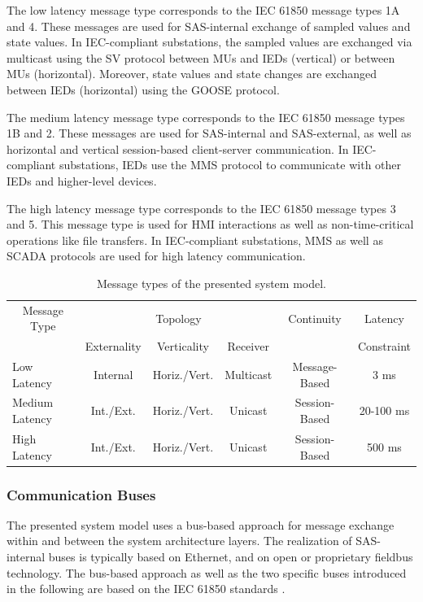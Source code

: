 The low latency message type corresponds to the IEC 61850 \cite{IEC61850P5} message types 1A and 4.
These messages are used for SAS-internal exchange of sampled values and state values.
In IEC-compliant substations, the sampled values are exchanged via multicast using the SV protocol between MUs and IEDs (vertical) or between MUs (horizontal).
Moreover, state values and state changes are exchanged between IEDs (horizontal) using the GOOSE protocol.

The medium latency message type corresponds to the IEC 61850 message types 1B and 2.
These messages are used for SAS-internal and SAS-external, as well as horizontal and vertical session-based client-server communication.
In IEC-compliant substations, IEDs use the MMS protocol to communicate with other IEDs and higher-level devices.

The high latency message type corresponds to the IEC 61850 message types 3 and 5.
This message type is used for HMI interactions as well as non-time-critical operations like file transfers.
In IEC-compliant substations, MMS as well as SCADA protocols are used for high latency communication.
\begin{table}
    \centering
    \small
    \caption{Message types of the presented system model.}
    \label{tab:message_types}
    \begin{tabular}{l c c c c c}
    \toprule
    \multicolumn{1}{c}{Message Type} & \multicolumn{3}{c}{Topology} & Continuity & Latency\\
    \cmidrule(lr){2-4}
    & Externality & Verticality & Receiver & & Constraint\\
    \midrule
    Low Latency & Internal & Horiz./Vert. & Multicast & Message-Based & 3 ms\\
    Medium Latency & Int./Ext. & Horiz./Vert. & Unicast & Session-Based & 20-100 ms\\
    High Latency & Int./Ext. & Horiz./Vert. & Unicast & Session-Based & 500 ms\\
    \bottomrule
    \end{tabular}
\end{table}

\subsubsection{Communication Buses}
The presented system model uses a bus-based approach for message exchange within and between the system architecture layers.
The realization of SAS-internal buses is typically based on Ethernet, and on open or proprietary fieldbus technology.
The bus-based approach as well as the two specific buses introduced in the following are based on the IEC 61850 standards \cite{IEC61850P5}.

